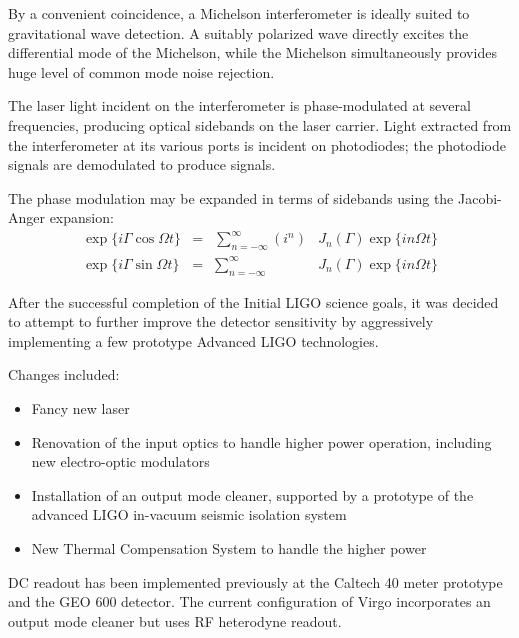 \label{chapter2}
\doublespace


By a convenient coincidence, a Michelson interferometer is ideally
suited to gravitational wave detection.  A suitably polarized wave
directly excites the differential mode of the Michelson, while the
Michelson simultaneously provides huge level of common mode noise
rejection.

\cite{Fritschel2001Readout}


The laser light incident on the interferometer is phase-modulated at
several frequencies, producing optical sidebands on the laser carrier.
Light extracted from the interferometer at its various ports is
incident on photodiodes; the photodiode signals are demodulated to
produce signals.


The phase modulation may be expanded in terms of sidebands using the
Jacobi-Anger expansion:
\begin{equation}
\begin{array}{rcll}
\exp\{i\Gamma\cos\Omega t\} & = &\sum_{n=-\infty}^{\infty} \left(i^n\right) & J_n(\Gamma) \exp\{i n \Omega t\} \\
\exp\{i\Gamma\sin\Omega t\} & = & \sum_{n=-\infty}^{\infty} & J_n(\Gamma) \exp\{i n \Omega t\}
\end{array}
\end{equation}




After the successful completion of the Initial LIGO science goals, it
was decided
\cite{Adhikari2006Enhanced,T050252,JoshSmithEnhancedAdvanced} to
attempt to further improve the detector sensitivity by aggressively
implementing a few prototype Advanced LIGO technologies.

Changes included:
\begin{itemize}
\item Fancy new laser
\item Renovation of the input optics to handle higher power operation, including new electro-optic modulators \cite{Quetschke2008ElectroOptic}
\item Installation of an output mode cleaner, supported by a prototype of the advanced LIGO in-vacuum seismic isolation system
\item New Thermal Compensation System to handle the higher power
\end{itemize}

DC readout has been implemented previously at the Caltech 40 meter
prototype \cite{Ward2008DC,RobWardThesis} and the GEO 600
detector\cite{GeoDC,Prijatelj2010,Degallaix2010Commissioning}.  The
current configuration of Virgo incorporates an output mode cleaner but
uses RF heterodyne readout\cite{Acernese2008Virgo}.



